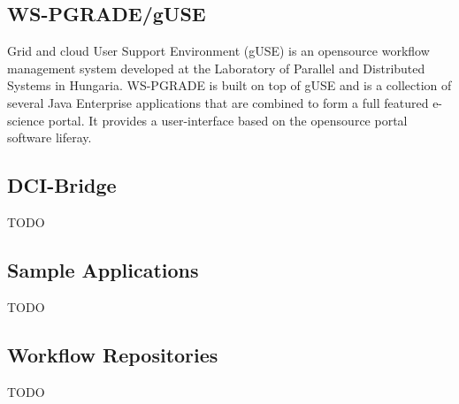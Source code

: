 \subsection{WS-PGRADE/gUSE}\label{guse}

Grid and cloud User Support Environment (gUSE) is an opensource workflow management system developed at the Laboratory of Parallel and Distributed Systems in Hungaria.
WS-PGRADE is built on top of gUSE and is a collection of several Java Enterprise applications that are combined to form a full featured e-science portal.
It provides a user-interface based on the opensource portal software liferay.


\subsection{DCI-Bridge}\label{dci}

TODO

\subsection{Sample Applications}\label{applications}

TODO

\subsection{Workflow Repositories}\label{repositories}

TODO